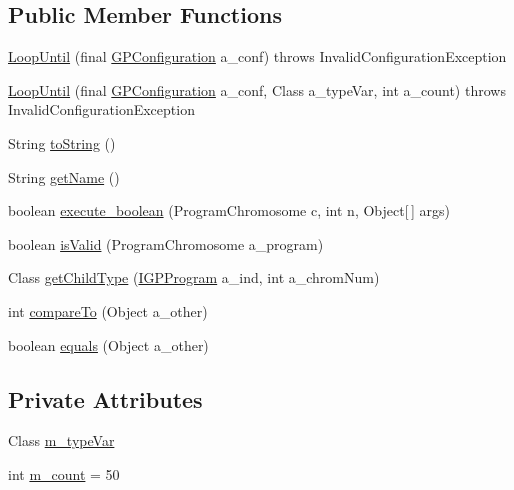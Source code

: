 \subsection*{Public Member Functions}
\begin{DoxyCompactItemize}
\item 
\hyperlink{classexamples_1_1gp_1_1painted_desert_1_1_loop_until_a23ca33180aaf65ee75ab17a3f7a6bc7f}{Loop\-Until} (final \hyperlink{classorg_1_1jgap_1_1gp_1_1impl_1_1_g_p_configuration}{G\-P\-Configuration} a\-\_\-conf)  throws Invalid\-Configuration\-Exception 
\item 
\hyperlink{classexamples_1_1gp_1_1painted_desert_1_1_loop_until_a039ece5d3f307fb5dff0a2dc1ad325a8}{Loop\-Until} (final \hyperlink{classorg_1_1jgap_1_1gp_1_1impl_1_1_g_p_configuration}{G\-P\-Configuration} a\-\_\-conf, Class a\-\_\-type\-Var, int a\-\_\-count)  throws Invalid\-Configuration\-Exception 
\item 
String \hyperlink{classexamples_1_1gp_1_1painted_desert_1_1_loop_until_a2954329de1d716993a9d57ce58862d20}{to\-String} ()
\item 
String \hyperlink{classexamples_1_1gp_1_1painted_desert_1_1_loop_until_aeec5e9ac9ea009cc96e022576ba6b817}{get\-Name} ()
\item 
boolean \hyperlink{classexamples_1_1gp_1_1painted_desert_1_1_loop_until_a8ae557b33264ede9e7a71ccc2db2a6d4}{execute\-\_\-boolean} (Program\-Chromosome c, int n, Object\mbox{[}$\,$\mbox{]} args)
\item 
boolean \hyperlink{classexamples_1_1gp_1_1painted_desert_1_1_loop_until_a68e7855aedc2e060e55b8372a5154f54}{is\-Valid} (Program\-Chromosome a\-\_\-program)
\item 
Class \hyperlink{classexamples_1_1gp_1_1painted_desert_1_1_loop_until_a46f7e86981a959aae957d04a56c31663}{get\-Child\-Type} (\hyperlink{interfaceorg_1_1jgap_1_1gp_1_1_i_g_p_program}{I\-G\-P\-Program} a\-\_\-ind, int a\-\_\-chrom\-Num)
\item 
int \hyperlink{classexamples_1_1gp_1_1painted_desert_1_1_loop_until_aa94b67cd8c936c3c00a34efeb018c8de}{compare\-To} (Object a\-\_\-other)
\item 
boolean \hyperlink{classexamples_1_1gp_1_1painted_desert_1_1_loop_until_a254978784e8f735bc0f61f6bcc75d40d}{equals} (Object a\-\_\-other)
\end{DoxyCompactItemize}
\subsection*{Private Attributes}
\begin{DoxyCompactItemize}
\item 
Class \hyperlink{classexamples_1_1gp_1_1painted_desert_1_1_loop_until_a75c9e286dacb1b598da2ef2245657865}{m\-\_\-type\-Var}
\item 
int \hyperlink{classexamples_1_1gp_1_1painted_desert_1_1_loop_until_aaeff029a79a3bdc15a85b0b34a8f6ec3}{m\-\_\-count} = 50
\end{DoxyCompactItemize}
